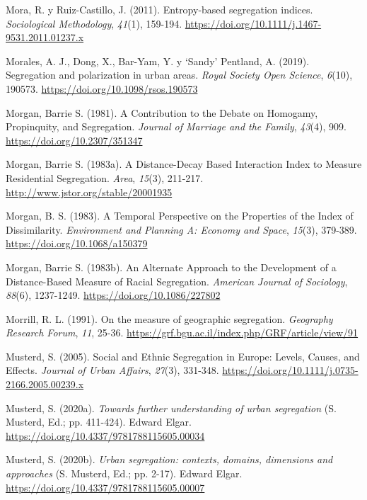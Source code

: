 \documentclass[
  spanish,
  a4paper,%
  chapterprefix=true,%
  DIV=calc,%
  twoside]{scrbook}%
\newlength{\cslhangindent}
\newenvironment{CSLReferences}[2] %
 {\begin{list}{}{%
  \setlength{\itemindent}{0pt}
  \setlength{\leftmargin}{0pt}
  \setlength{\parsep}{0pt}
  \ifodd #1
   \setlength{\leftmargin}{\cslhangindent}
   \setlength{\itemindent}{-1\cslhangindent}
  \fi
  \setlength{\itemsep}{#2\baselineskip}}}
 {\end{list}}
\begin{document}
\begin{CSLReferences}{1}{0}
Mora, R. y Ruiz-Castillo, J. (2011). Entropy-based segregation indices. \emph{Sociological Methodology}, \emph{41}(1), 159-194. \url{https://doi.org/10.1111/j.1467-9531.2011.01237.x}

Morales, A. J., Dong, X., Bar-Yam, Y. y `Sandy' Pentland, A. (2019). Segregation and polarization in urban areas. \emph{Royal Society Open Science}, \emph{6}(10), 190573. \url{https://doi.org/10.1098/rsos.190573}

Morgan, Barrie S. (1981). A Contribution to the Debate on Homogamy, Propinquity, and Segregation. \emph{Journal of Marriage and the Family}, \emph{43}(4), 909. \url{https://doi.org/10.2307/351347}

Morgan, Barrie S. (1983a). A Distance-Decay Based Interaction Index to Measure Residential Segregation. \emph{Area}, \emph{15}(3), 211-217. \url{http://www.jstor.org/stable/20001935}

Morgan, B. S. (1983). A Temporal Perspective on the Properties of the Index of Dissimilarity. \emph{Environment and Planning A: Economy and Space}, \emph{15}(3), 379-389. \url{https://doi.org/10.1068/a150379}

Morgan, Barrie S. (1983b). An Alternate Approach to the Development of a Distance-Based Measure of Racial Segregation. \emph{American Journal of Sociology}, \emph{88}(6), 1237-1249. \url{https://doi.org/10.1086/227802}

Morrill, R. L. (1991). On the measure of geographic segregation. \emph{Geography Research Forum}, \emph{11}, 25-36. \url{https://grf.bgu.ac.il/index.php/GRF/article/view/91}

Musterd, S. (2005). Social and Ethnic Segregation in Europe: Levels, Causes, and Effects. \emph{Journal of Urban Affairs}, \emph{27}(3), 331-348. \url{https://doi.org/10.1111/j.0735-2166.2005.00239.x}

Musterd, S. (2020a). \emph{Towards further understanding of urban segregation} (S. Musterd, Ed.; pp. 411-424). Edward Elgar. \url{https://doi.org/10.4337/9781788115605.00034}

Musterd, S. (2020b). \emph{Urban segregation: contexts, domains, dimensions and approaches} (S. Musterd, Ed.; pp. 2-17). Edward Elgar. \url{https://doi.org/10.4337/9781788115605.00007}


\end{CSLReferences}
\end{document}
